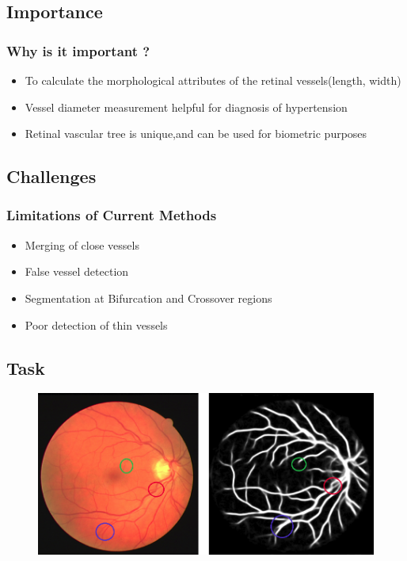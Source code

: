 \documentclass{beamer}
\begin{document}
\subsection{Importance}
\begin{frame}
\frametitle{Why is it important ?}
\begin{itemize}
\item To calculate the morphological attributes of the retinal vessels(length, width)
\item Vessel diameter measurement helpful for diagnosis of hypertension
\item Retinal vascular tree is unique,and can be used for biometric purposes

\end{itemize}
\end{frame}


\subsection{Challenges}
\begin{frame}
\frametitle{Limitations of Current Methods}
\begin{itemize}
\item Merging of close vessels
\item False vessel detection
\item Segmentation at Bifurcation and Crossover regions
\item Poor detection of thin vessels

\end{itemize}
\end{frame}

\subsection{Task}
\begin{frame}
\begin{figure}
\includegraphics[width=1.0\linewidth]{Images/problem1.png}%
\end{figure}
\end{frame}
\end{document}

